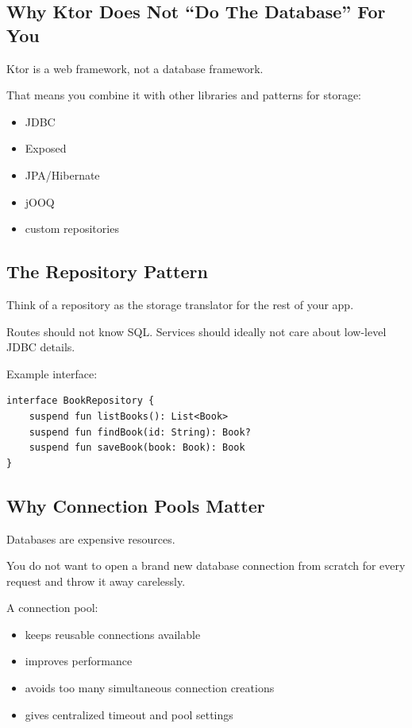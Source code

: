 \documentclass[11pt,a4paper]{article}
\begin{document}
\subsection{Why Ktor Does Not ``Do The Database'' For You}

Ktor is a web framework, not a database framework.

That means you combine it with other libraries and patterns for storage:
\begin{itemize}
    \item JDBC
    \item Exposed
    \item JPA/Hibernate
    \item jOOQ
    \item custom repositories
\end{itemize}

\subsection{The Repository Pattern}

Think of a repository as the storage translator for the rest of your app.

Routes should not know SQL.
Services should ideally not care about low-level JDBC details.

Example interface:

\begin{lstlisting}[style=kazekotlin]
interface BookRepository {
    suspend fun listBooks(): List<Book>
    suspend fun findBook(id: String): Book?
    suspend fun saveBook(book: Book): Book
}
\end{lstlisting}

\subsection{Why Connection Pools Matter}

Databases are expensive resources.

You do not want to open a brand new database connection from scratch for every request and throw it away carelessly.

A connection pool:
\begin{itemize}
    \item keeps reusable connections available
    \item improves performance
    \item avoids too many simultaneous connection creations
    \item gives centralized timeout and pool settings
\end{itemize}
\end{document}
